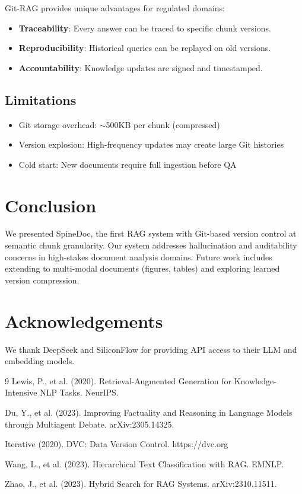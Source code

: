\documentclass[11pt]{article}
\begin{document}
Git-RAG provides unique advantages for regulated domains:
\begin{itemize}
    \item \textbf{Traceability}: Every answer can be traced to specific chunk versions.
    \item \textbf{Reproducibility}: Historical queries can be replayed on old versions.
    \item \textbf{Accountability}: Knowledge updates are signed and timestamped.
\end{itemize}

\subsection{Limitations}

\begin{itemize}
    \item Git storage overhead: $\sim$500KB per chunk (compressed)
    \item Version explosion: High-frequency updates may create large Git histories
    \item Cold start: New documents require full ingestion before QA
\end{itemize}

\section{Conclusion}

We presented SpineDoc, the first RAG system with Git-based version control at semantic chunk granularity. Our system addresses hallucination and auditability concerns in high-stakes document analysis domains. Future work includes extending to multi-modal documents (figures, tables) and exploring learned version compression.

\section*{Acknowledgements}

We thank DeepSeek and SiliconFlow for providing API access to their LLM and embedding models.


\begin{thebibliography}{9}
Lewis, P., et al. (2020). Retrieval-Augmented Generation for Knowledge-Intensive NLP Tasks. NeurIPS.

Du, Y., et al. (2023). Improving Factuality and Reasoning in Language Models through Multiagent Debate. arXiv:2305.14325.

Iterative (2020). DVC: Data Version Control. https://dvc.org

Wang, L., et al. (2023). Hierarchical Text Classification with RAG. EMNLP.

Zhao, J., et al. (2023). Hybrid Search for RAG Systems. arXiv:2310.11511.
\end{thebibliography}
\end{document}
